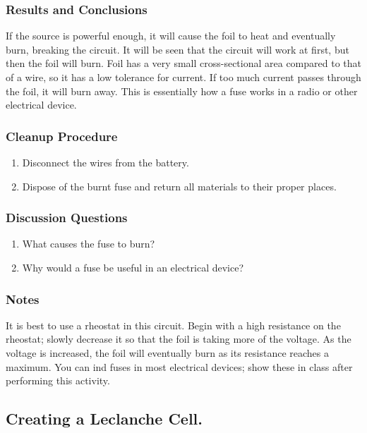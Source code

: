 \subsubsection*{Results and Conclusions}
If the source is powerful enough, it will cause the foil to heat and eventually burn, breaking the circuit.  It will be seen that the circuit will work at first, but then the foil will burn.  Foil has a very small cross-sectional area compared to that of a wire, so it has a low tolerance for current. If too much current passes through the foil, it will burn away. This is essentially how a fuse works in a radio or other electrical device.

\subsubsection*{Cleanup Procedure}
\begin{enumerate}
\item{Disconnect the wires from the battery.}
\item{Dispose of the burnt fuse and return all materials to their proper places.}
\end{enumerate}

\subsubsection*{Discussion Questions}
\begin{enumerate}
\item{What causes the fuse to burn?}
\item{Why would a fuse be useful in an electrical device?}
\end{enumerate}

\subsubsection*{Notes}
It is best to use a rheostat in this circuit.  Begin with a high resistance on the rheostat; slowly decrease it so that the foil is taking more of the voltage.  As the voltage is increased, the foil will eventually burn as its resistance reaches a maximum.
You can ind fuses in most electrical devices; show these in class after performing this activity.


\subsection{Creating a Leclanche Cell.}

